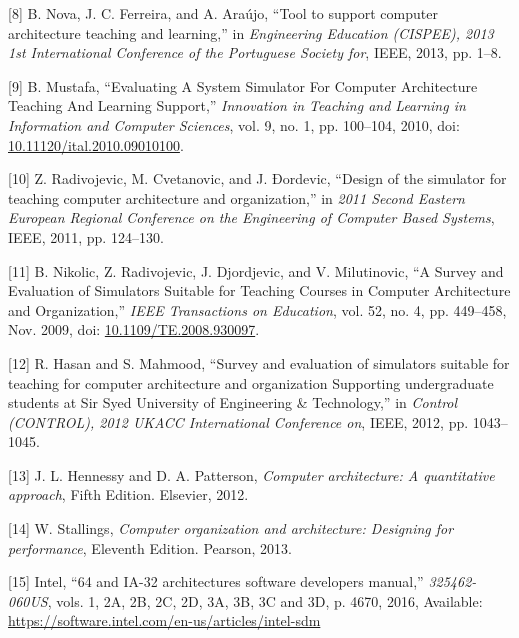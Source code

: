 \documentclass[12pt,twoside]{templates/unerthesis}
\newenvironment{cslreferences}%
  {}%
  {\par}
\begin{document}
\begin{cslreferences}
\leavevmode\hypertarget{ref-nova_tool_2013}{}%
{[}8{]} B. Nova, J. C. Ferreira, and A. Araújo, ``Tool to support computer architecture teaching and learning,'' in \emph{Engineering Education (CISPEE), 2013 1st International Conference of the Portuguese Society for}, IEEE, 2013, pp. 1--8.

\leavevmode\hypertarget{ref-mustafa_evaluating_2010}{}%
{[}9{]} B. Mustafa, ``Evaluating A System Simulator For Computer Architecture Teaching And Learning Support,'' \emph{Innovation in Teaching and Learning in Information and Computer Sciences}, vol. 9, no. 1, pp. 100--104, 2010, doi: \href{https://doi.org/10.11120/ital.2010.09010100}{10.11120/ital.2010.09010100}.

\leavevmode\hypertarget{ref-radivojevic_design_2011}{}%
{[}10{]} Z. Radivojevic, M. Cvetanovic, and J. Ðordevic, ``Design of the simulator for teaching computer architecture and organization,'' in \emph{2011 Second Eastern European Regional Conference on the Engineering of Computer Based Systems}, IEEE, 2011, pp. 124--130.

\leavevmode\hypertarget{ref-nikolic_survey_2009}{}%
{[}11{]} B. Nikolic, Z. Radivojevic, J. Djordjevic, and V. Milutinovic, ``A Survey and Evaluation of Simulators Suitable for Teaching Courses in Computer Architecture and Organization,'' \emph{IEEE Transactions on Education}, vol. 52, no. 4, pp. 449--458, Nov. 2009, doi: \href{https://doi.org/10.1109/TE.2008.930097}{10.1109/TE.2008.930097}.

\leavevmode\hypertarget{ref-hasan_survey_2012}{}%
{[}12{]} R. Hasan and S. Mahmood, ``Survey and evaluation of simulators suitable for teaching for computer architecture and organization Supporting undergraduate students at Sir Syed University of Engineering \& Technology,'' in \emph{Control (CONTROL), 2012 UKACC International Conference on}, IEEE, 2012, pp. 1043--1045.

\leavevmode\hypertarget{ref-hennessy_computer_2012}{}%
{[}13{]} J. L. Hennessy and D. A. Patterson, \emph{Computer architecture: A quantitative approach}, Fifth Edition. Elsevier, 2012.

\leavevmode\hypertarget{ref-stallings_computer_2013}{}%
{[}14{]} W. Stallings, \emph{Computer organization and architecture: Designing for performance}, Eleventh Edition. Pearson, 2013.

\leavevmode\hypertarget{ref-intel_64_2016}{}%
{[}15{]} Intel, ``64 and IA-32 architectures software developers manual,'' \emph{325462-060US}, vols. 1, 2A, 2B, 2C, 2D, 3A, 3B, 3C and 3D, p. 4670, 2016, Available: \url{https://software.intel.com/en-us/articles/intel-sdm}


\end{cslreferences}
\end{document}
